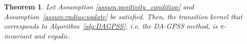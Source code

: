 \documentclass[sn-mathphys-num]{sn-jnl}%
\theoremstyle{thmstyleone}%
\newtheorem{theorem}{Theorem}%
\theoremstyle{thmstyletwo}%
\newtheorem{example}{Example}%
\theoremstyle{thmstylethree}%
\newcommand{\rhoapp}{\varrho_{{\rm app}}}
\newcommand{\change}[1]{\bgroup\color{black}#1\egroup}    %
\begin{document}




\begin{theorem}\label{theo:DAGPSS}
\change{Let Assumption \ref{assum:positivity_condition} and Assumption~\ref{assum:radius:update} be satisfied.} Then, the transition kernel that corresponds to Algorithm~\ref{alg:DAGPSS}, i.e. the DA-GPSS method, is $\pi$-invariant and \change{ergodic}.
\end{theorem}



\end{document}
